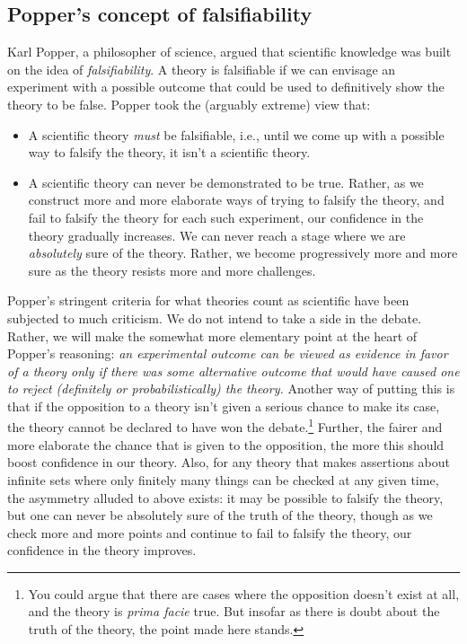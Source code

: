 \documentclass[10pt]{amsart}
\begin{document}
\subsection{Popper's concept of falsifiability}

Karl Popper, a philosopher of science, argued that scientific
knowledge was built on the idea of {\em falsifiability}. A theory is
falsifiable if we can envisage an experiment with a possible outcome
that could be used to definitively show the theory to be false. Popper
took the (arguably extreme) view that:

\begin{itemize}
\item A scientific theory {\em must} be falsifiable, i.e., until we
  come up with a possible way to falsify the theory, it isn't a
  scientific theory.
\item A scientific theory can never be demonstrated to be
  true. Rather, as we construct more and more elaborate ways of trying
  to falsify the theory, and fail to falsify the theory for each such
  experiment, our confidence in the theory gradually increases. We can
  never reach a stage where we are {\em absolutely} sure of the
  theory. Rather, we become progressively more and more sure as the
  theory resists more and more challenges.
\end{itemize}

Popper's stringent criteria for what theories count as scientific have
been subjected to much criticism. We do not intend to take a side in
the debate. Rather, we will make the somewhat more elementary point at
the heart of Popper's reasoning: {\em an experimental outcome can be
  viewed as evidence in favor of a theory only if there was some
  alternative outcome that would have caused one to reject (definitely
  or probabilistically) the theory.} Another way of putting this is
that if the opposition to a theory isn't given a serious chance to
make its case, the theory cannot be declared to have won the
debate.\footnote{You could argue that there are cases where the
  opposition doesn't exist at all, and the theory is {\em prima facie}
  true. But insofar as there is doubt about the truth of the theory,
  the point made here stands.} Further, the fairer and more elaborate
the chance that is given to the opposition, the more this should boost
confidence in our theory. Also, for any theory that makes assertions
about infinite sets where only finitely many things can be checked at
any given time, the asymmetry alluded to above exists: it may be
possible to falsify the theory, but one can never be absolutely sure
of the truth of the theory, though as we check more and more points
and continue to fail to falsify the theory, our confidence in the
theory improves.
\end{document}
